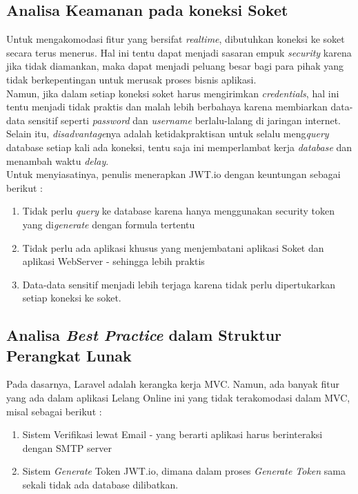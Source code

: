 \subsection{Analisa Keamanan pada koneksi Soket}
\label{alasan-socket.io}
Untuk mengakomodasi fitur yang bersifat \textit{realtime}, dibutuhkan koneksi ke soket secara terus menerus. Hal ini tentu dapat menjadi sasaran empuk \textit{security} karena jika tidak diamankan, maka dapat menjadi peluang besar bagi para pihak yang tidak berkepentingan untuk merusak proses bisnis aplikasi.\\
\indent Namun, jika dalam setiap koneksi soket harus mengirimkan \textit{credentials}, hal ini tentu menjadi tidak praktis dan malah lebih berbahaya karena membiarkan data-data sensitif seperti \textit{password} dan \textit{username} berlalu-lalang di jaringan internet. Selain itu, \textit{disadvantage}nya adalah ketidakpraktisan untuk selalu meng\textit{query} database setiap kali ada koneksi, tentu saja ini memperlambat kerja \textit{database} dan menambah waktu \textit{delay}.\\
\indent Untuk menyiasatinya, penulis menerapkan JWT.io dengan keuntungan sebagai berikut :
\begin{enumerate}
	\item Tidak perlu \textit{query} ke database karena hanya menggunakan security token yang di\textit{generate} dengan formula tertentu
	\item Tidak perlu ada aplikasi khusus yang menjembatani aplikasi Soket dan aplikasi WebServer - sehingga lebih praktis
	\item Data-data sensitif menjadi lebih terjaga karena tidak perlu dipertukarkan setiap koneksi ke soket.
\end{enumerate}

\subsection{Analisa \textit{Best Practice} dalam Struktur Perangkat Lunak}
\label{alasan-best-practice}
Pada dasarnya, Laravel adalah kerangka kerja MVC. Namun, ada banyak fitur yang ada dalam aplikasi Lelang Online ini yang tidak terakomodasi dalam MVC, misal sebagai berikut :
\begin{enumerate}
	\item Sistem Verifikasi lewat Email - yang berarti aplikasi harus berinteraksi dengan SMTP server
	\item Sistem \textit{Generate} Token JWT.io, dimana dalam proses \textit{Generate Token} sama sekali tidak ada database dilibatkan.
\end{enumerate}

